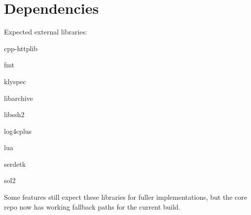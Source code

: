 \chapter{Dependencies }
\label{md__2home_2chubakpdp11_2sattyre_2docs_2dependencies}
\label{md__2home_2chubakpdp11_2sattyre_2docs_2dependencies_autotoc_md1}%
%


Expected external libraries:\+


\begin{DoxyItemize}
\item cpp-\/httplib
\item fmt
\item klyspec
\item libarchive
\item libssh2
\item log4cplus
\item lua
\item serdetk
\item sol2
\end{DoxyItemize}

Some features still expect these libraries for fuller implementations, but the core repo now has working fallback paths for the current build. 